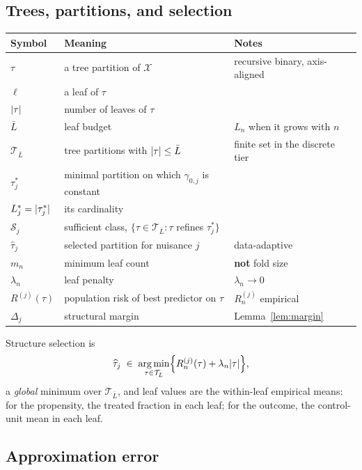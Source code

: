 \documentclass[11pt]{article}
\theoremstyle{plain}
\theoremstyle{definition}
\theoremstyle{remark}
\newcommand{\cX}{\mathcal{X}}
\newcommand{\cT}{\mathcal{T}}
\newcommand{\cS}{\mathcal{S}}
\newcommand{\that}{\widehat{\tau}}
\DeclareMathOperator*{\argmin}{arg\,min}
\DeclarePairedDelimiter{\card}{\lvert}{\rvert}
\begin{document}
\subsection{Trees, partitions, and selection}

\begin{center}
\begin{tabular}{@{}ll@{\hspace{2em}}l@{}}
\toprule
Symbol & Meaning & Notes \\
\midrule
$\tau$ & a tree partition of $\cX$ & recursive binary, axis-aligned \\
$\ell$ & a leaf of $\tau$ & \\
$\card{\tau}$ & number of leaves of $\tau$ & \\
$\bar L$ & leaf budget & $L_n$ when it grows with $n$ \\
$\cT_{\bar L}$ & tree partitions with $\card{\tau}\le\bar L$ & finite set in the discrete tier \\
$\tau^*_j$ & minimal partition on which $\gamma_{0,j}$ is constant & \\
$L^*_j=\card{\tau^*_j}$ & its cardinality & \\
$\cS_j$ & sufficient class, $\{\tau\in\cT_{\bar L}:\tau$ refines $\tau^*_j\}$ & \\
$\that_j$ & selected partition for nuisance $j$ & data-adaptive \\
$m_n$ & minimum leaf count & \textbf{not} fold size \\
$\lambda_n$ & leaf penalty & $\lambda_n\to0$ \\
$R^{(j)}(\tau)$ & population risk of best predictor on $\tau$ & $R^{(j)}_n$ empirical \\
$\Delta_j$ & structural margin & Lemma~\ref{lem:margin} \\
\bottomrule
\end{tabular}
\end{center}

Structure selection is
\begin{equation}\label{eq:select}
  \that_j \;\in\; \argmin_{\tau\in\cT_{\bar L}}
    \Bigl\{ R^{(j)}_n(\tau) + \lambda_n\card{\tau} \Bigr\},
\end{equation}
a \emph{global} minimum over $\cT_{\bar L}$, and leaf values are the
within-leaf empirical means: for the propensity, the treated fraction in each
leaf; for the outcome, the control-unit mean in each leaf.

\subsection{Approximation error}
\end{document}

